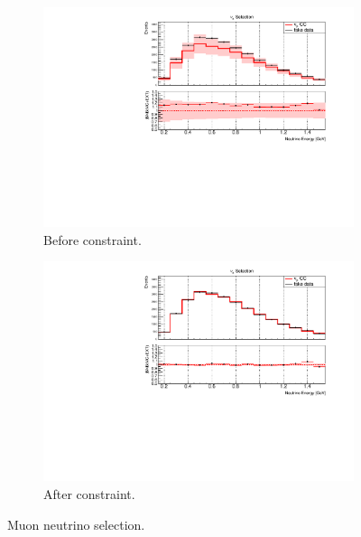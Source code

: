 \begin{figure}[H] 
\begin{center}
    \begin{subfigure}[b]{0.45\textwidth}
    \centering
    \includegraphics[width=1.00\textwidth]{Fakedata/set2/nue_numu_reco_e_H1_mc_fakedata_set2_numu_before_data_constraint.pdf}
    \caption{\label{fig:fakedata:set2:numu_before_constrain} Before constraint.}
    \end{subfigure}
    \begin{subfigure}[b]{0.45\textwidth}
    \centering
    \includegraphics[width=1.00\textwidth]{Fakedata/set2/nue_numu_reco_e_H1_mc_fakedata_set2_scaled_numu.pdf}
    \caption{\label{fig:fakedata:set1:numu_after_constrain} After constraint.}
    \end{subfigure}
\caption{\label{fig:fakedata:set1:numu_const} Muon neutrino selection.}
\end{center}
\end{figure}

